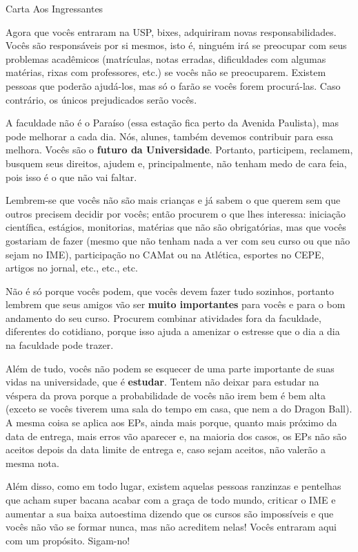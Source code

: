 \begin{editorial}{Carta Aos Ingressantes}

Agora que vocês entraram na USP, bixes, adquiriram novas
responsabilidades. Vocês são responsáveis por si mesmos, isto é, ninguém irá se
preocupar com seus problemas acadêmicos (matrículas, notas erradas, dificuldades
com algumas matérias, rixas com professores, etc.) se vocês não se
preocuparem. Existem pessoas que poderão ajudá-los, mas só o farão se vocês
forem procurá-las. Caso contrário, os únicos prejudicados serão vocês.

A faculdade não é o Paraíso (essa estação fica perto da Avenida Paulista), mas pode
melhorar a cada dia. Nós, alunes, também devemos contribuir para essa melhora.
Vocês são o \textbf{futuro da Universidade}. Portanto, participem, reclamem, busquem seus
direitos, ajudem e, principalmente, não tenham medo de cara feia, pois isso é o
que não vai faltar.

Lembrem-se que vocês não são mais crianças e já sabem o que querem sem que
outros precisem decidir por vocês; então procurem o que lhes interessa: iniciação
científica, estágios, monitorias, matérias que não são obrigatórias, mas que
vocês gostariam de fazer (mesmo que não tenham nada a ver com seu curso ou que não
sejam no IME), participação no CAMat ou na Atlética, esportes no CEPE, artigos no
jornal, etc., etc., etc.

Não é só porque vocês podem, que vocês devem fazer tudo sozinhos, portanto lembrem que
seus amigos vão ser \textbf{muito importantes} para vocês e para o bom andamento do seu
curso. Procurem combinar atividades fora da faculdade, diferentes do cotidiano,
porque isso ajuda a amenizar o estresse que o dia a dia na faculdade pode
trazer.

Além de tudo, vocês não podem se esquecer de uma parte importante de suas vidas
na universidade, que é \textbf{estudar}. Tentem não deixar para estudar na véspera da
prova porque a probabilidade de vocês não irem bem é bem alta (exceto se vocês
tiverem uma sala do tempo em casa, que nem a do Dragon Ball). A mesma coisa se
aplica aos EPs, ainda mais porque, quanto mais próximo da data de entrega, mais
erros vão aparecer e, na maioria dos casos, os EPs não são aceitos depois da
data limite de entrega e, caso sejam aceitos, não valerão a mesma nota.

Além disso, como em todo lugar, existem aquelas pessoas ranzinzas e
pentelhas que acham super bacana acabar com a graça de todo mundo,
criticar o IME e aumentar a sua baixa autoestima dizendo que os cursos
são impossíveis e que vocês não vão se formar nunca, mas não acreditem
nelas! Vocês entraram aqui com um propósito. Sigam-no!  


\end{editorial}
